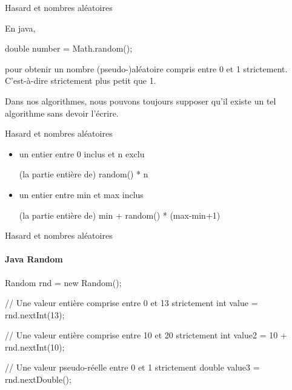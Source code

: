 \begin{hideedit}
\begin{frame}[fragile]{Hasard et nombres aléatoires}
  \subtitle{en Java}
  En java,

  \begin{java}
double number = Math.random();
  \end{java}

  pour obtenir un nombre (pseudo-)aléatoire compris entre 0 et 1
  strictement. C'est-à-dire strictement plus petit que 1.


  Dans nos algorithmes, nous pouvons toujours supposer qu'il existe un
  tel algorithme sans devoir l'écrire.

  \begin{center}
  \end{center}
\end{frame}

\begin{frame}{Hasard et nombres aléatoires}
  \begin{itemize}[<+->]
    \item un entier entre 0 inclus et n exclu
      \pause
      \begin{langagenaturel}
        (la partie entière de) random() * n
      \end{langagenaturel}

    \item un entier entre min et max inclus
      \pause
      \begin{langagenaturel}
        (la partie entière de) min + random() * (max-min+1)
      \end{langagenaturel}
  \end{itemize}
\end{frame}

\begin{frame}[fragile]{Hasard et nombres aléatoires}
  \framesubtitle{Java Random}
  \begin{java}
Random rnd = new Random();

// Une valeur entière comprise entre 0 et 13 strictement
int value = rnd.nextInt(13);

// Une valeur entière comprise entre 10 et 20 strictement
int value2 = 10 + rnd.nextInt(10);

// Une valeur pseudo-réelle entre 0 et 1 strictement
double value3 = rnd.nextDouble();
  \end{java}
\end{frame}


\end{hideedit}
